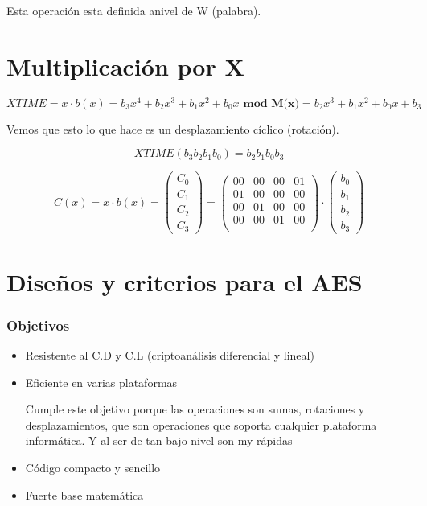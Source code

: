  Esta operación esta definida  anivel de W (palabra).
 
 \section{Multiplicación por X}
 
 $$XTIME = x \cdot b(x) = b_3x^4 + b_2 x^3 + b_1 x^2 + b_0 x \textbf{ mod M(x)} = b_2x^3 +b_1x^2 + b_0x + b_3$$
 
 Vemos que esto lo que hace es un desplazamiento cíclico (rotación).
 
 $$XTIME(b_3 b_2 b_1 b_0) = b_2 b_1 b_0 b_3$$
 
 
 $$C(x) = x \cdot b(x) = \left(\begin{matrix}
 	C_0\\C_1\\C_2\\C_3
 \end{matrix} \right) = \left(\begin{matrix}
 00 & 00 & 00 & 01\\
 01 & 00 & 00 & 00\\
 00 & 01 & 00 & 00\\
 00 & 00 & 01 & 00\\
\end{matrix}\right) \cdot \left( \begin{matrix}
b_0\\
b_1\\
b_2\\
b_3
\end{matrix}\right)$$
 
 
\section{Diseños y criterios para el AES}

\subsubsection{Objetivos}

\begin{itemize}
	\item Resistente al C.D y C.L (criptoanálisis diferencial y lineal)
	\item Eficiente en varias plataformas
	
	Cumple este objetivo porque las operaciones son sumas, rotaciones y desplazamientos, que son operaciones que soporta cualquier plataforma informática. Y al ser de tan bajo nivel son my rápidas
	
	\item Código compacto y sencillo
	\item Fuerte base matemática
\end{itemize}

